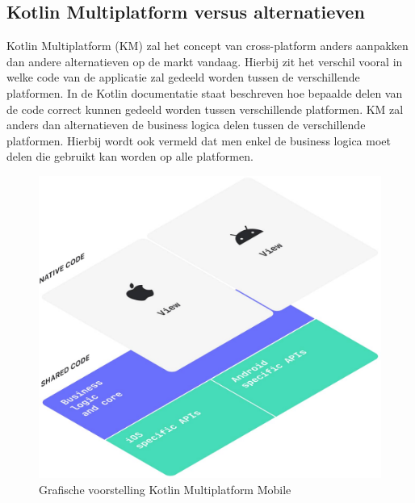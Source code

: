 \subsection{Kotlin Multiplatform versus  alternatieven}
\label{sec:kotlin_multiplatform_versus_alternatieven}
Kotlin Multiplatform (KM) zal het concept van cross-platform anders aanpakken dan andere alternatieven op de markt vandaag. Hierbij zit het verschil vooral in welke code van de applicatie zal gedeeld worden tussen de verschillende platformen. In de Kotlin documentatie staat beschreven hoe bepaalde delen van de code correct kunnen gedeeld worden tussen verschillende platformen. KM zal anders dan alternatieven de business logica delen tussen de verschillende platformen.\autocite{Kotlin2021} Hierbij wordt ook vermeld dat men enkel de business logica moet delen die gebruikt kan worden op alle platformen. 

\begin{figure}
    \includegraphics[width=\linewidth]{kmm.jpg}
    \caption{Grafische voorstelling Kotlin Multiplatform Mobile \autocite{KotlinKMM}}
    \label{fig:kmm}
\end{figure}

